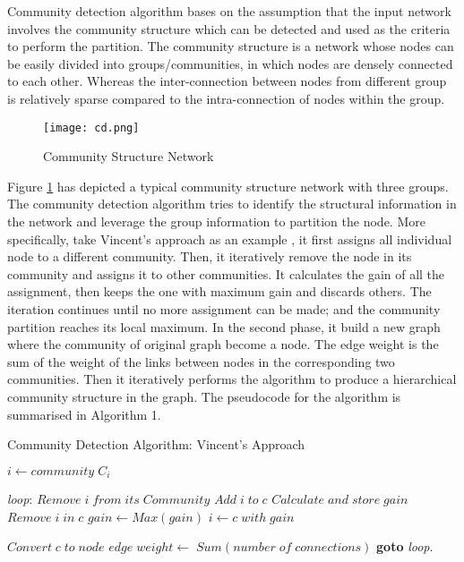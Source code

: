 Community detection algorithm bases on the assumption that the input network involves the community structure \cite{Girvan2002} which can be detected and used as the criteria to perform the partition. The community structure is a network whose nodes can be easily divided into groups/communities, in which nodes are densely connected to each other. Whereas the inter-connection between nodes from different group is relatively sparse compared to the intra-connection of nodes within the group.

\begin{figure}[t]
  \centering
  \texttt{[image: cd.png]}
  \caption{Community Structure Network}\label{fig:cd}
\end{figure}


Figure \ref{fig:cd} has depicted a typical community structure network with three groups. The community detection algorithm tries to identify the structural information in the network and leverage the group information to partition the node. More specifically, take Vincent's approach as an example \cite{blondel2008fuc}, it first assigns all individual node to a different community. Then, it iteratively remove the node in its community and assigns it to other communities. It calculates the gain of all the assignment, then keeps the one with maximum gain and discards others. The iteration continues until no more assignment can be made; and the community partition reaches its local maximum. In the second phase, it build a new graph where the community of original graph become a node. The edge weight is the sum of the weight of the links between nodes in the corresponding two communities. Then it iteratively performs the algorithm to produce a hierarchical community structure in the graph. The pseudocode for the algorithm is summarised in Algorithm 1.

\begin{algorithm}
\caption{Community Detection Algorithm: Vincent's Approach}\label{euclid}
\begin{algorithmic}[1]

\State $i \gets community \; C_{i}$
\EndFor
\EndProcedure

\State \emph{loop}:
\State $Remove  \; i \;from \;its \;Community$
\State $Add \;i \;to \;c$
\State $Calculate \;and \;store \;gain$
\State $Remove \;i \;in \;c$
\EndFor
\State $gain \gets Max(gain)$
\State $i \gets c \; with \;gain$
\EndFor
\EndProcedure

\State $Convert \;c \;to \;node$
\State $edge \;weight \gets \;Sum(number \;of \;connections)$
\EndFor
\State \textbf{goto} \emph{loop}.
\EndProcedure
\end{algorithmic}
\end{algorithm}

